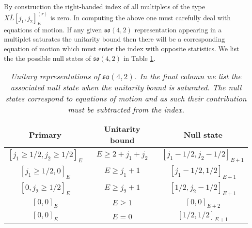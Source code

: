 \documentclass[main.tex]{subfiles}
\begin{document}
By construction the right-handed index of all multiplets of the type \newline$X\overline{L}[j_1,j_2]_E^{(r)}$ is zero. In computing the above one must carefully deal with equations of motion. If any given $\mathfrak{so}(4,2)$ representation appearing in a multiplet saturates the unitarity bound then there will be a corresponding equation of motion which must enter the index with opposite statistics. We list the the possible null states of $\mathfrak{so}(4,2)$ in Table \ref{tab:so42nulls}.
\begin{table}
\centering
\begin{tabular}{|c|c|c|}
\hline
Primary&Unitarity bound& Null state\\\hline
$[j_1\geq1/2,j_2\geq1/2]_{E}$&$E\geq2+j_1+j_2$&$[j_1-1/2,j_2-1/2]_{E+1}$\\\hline
$[j_1\geq1/2,0]_{E}$&$E\geq j_1+1$&$[j_1-1/2,1/2]_{E+1}$\\\hline
$[0,j_2\geq1/2]_{E}$&$E\geq j_2+1$&$[1/2,j_2-1/2]_{E+1}$\\\hline
$[0,0]_{E}$&$E\geq1$&$[0,0]_{E+2}$\\\hline
$[0,0]_{E}$&$E=0$&$[1/2,1/2]_{E+1}$\\\hline
\end{tabular}
\caption{\textit{Unitary representations of $\mathfrak{so}(4,2)$. In the final column we list the associated null state when the unitarity bound is saturated. The null states correspond to equations of motion and as such their contribution must be subtracted from the index.}}
\label{tab:so42nulls}
\end{table}
\end{document}
